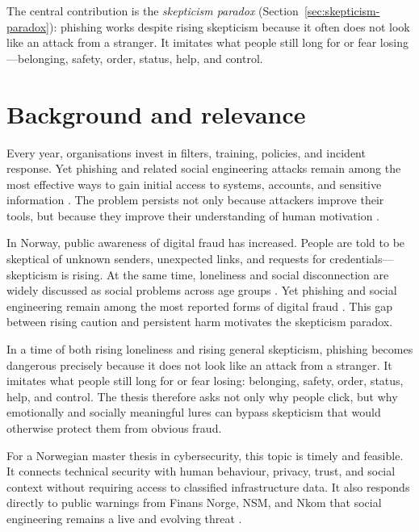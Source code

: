 \documentclass[UKenglish,12pt]{master-style}
\begin{document}
The central contribution is the \emph{skepticism paradox} (Section~\ref{sec:skepticism-paradox}): phishing works despite rising skepticism because it often does not look like an attack from a stranger. It imitates what people still long for or fear losing---belonging, safety, order, status, help, and control.

\section{Background and relevance}

Every year, organisations invest in filters, training, policies, and incident response. Yet phishing and related social engineering attacks remain among the most effective ways to gain initial access to systems, accounts, and sensitive information \parencite{enisa2024threat,cisaPhishing}. The problem persists not only because attackers improve their tools, but because they improve their understanding of human motivation \parencite{hadnagy2018social}.

In Norway, public awareness of digital fraud has increased. People are told to be skeptical of unknown senders, unexpected links, and requests for credentials---skepticism is rising. At the same time, loneliness and social disconnection are widely discussed as social problems across age groups \parencite{ssb2025loneliness,helsedirektoratet2024ensomhet}. Yet phishing and social engineering remain among the most reported forms of digital fraud \parencite{nsm2026risk,nkomSvindel,finansnorge2026svindel}. This gap between rising caution and persistent harm motivates the skepticism paradox.

In a time of both rising loneliness and rising general skepticism, phishing becomes dangerous precisely because it does not look like an attack from a stranger. It imitates what people still long for or fear losing: belonging, safety, order, status, help, and control. The thesis therefore asks not only why people click, but why emotionally and socially meaningful lures can bypass skepticism that would otherwise protect them from obvious fraud.

For a Norwegian master thesis in cybersecurity, this topic is timely and feasible. It connects technical security with human behaviour, privacy, trust, and social context without requiring access to classified infrastructure data. It also responds directly to public warnings from Finans Norge, NSM, and Nkom that social engineering remains a live and evolving threat \parencite{finansnorge2026svindel,nsm2026risk,nkomSvindel}.
\end{document}

